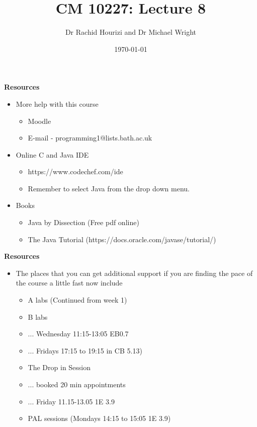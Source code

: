 \documentclass{beamer}
\begin{document}

\title{CM 10227: Lecture 8}
\author{Dr Rachid Hourizi and Dr Michael Wright}
\date{\today}
\frame{\titlepage}

\begin{frame} 
\begin{center}
\textbf{Resources}
\end{center}
\begin{itemize}
\item More help with this course
\begin{itemize}
\item Moodle
\item E-mail - programming1@lists.bath.ac.uk
\end{itemize}
\item Online C and Java IDE
\begin{itemize}
\item https://www.codechef.com/ide
\item Remember to select Java from the drop down menu.
\end{itemize}
\item Books
\begin{itemize}
\item Java by Dissection (Free pdf online)
\item The Java Tutorial (https://docs.oracle.com/javase/tutorial/)
\end{itemize}
\end{itemize}
\end{frame}

\begin{frame} 
\begin{center}
\textbf{Resources}
\end{center}
\begin{itemize}
\item The places that you can get additional support if you are finding the pace of the course a little fast now include
\begin{itemize}
\item A labs (Continued from week 1)
\item B labs 
\item ... Wednesday 11:15-13:05 EB0.7
\item ... Fridays 17:15 to 19:15 in CB 5.13)
\item The Drop in Session 
\item ... booked 20 min appointments
\item ... Friday 11.15-13.05 1E 3.9
\item PAL sessions (Mondays 14:15 to 15:05 1E 3.9)
\end{itemize}
\end{itemize}
\end{frame}
\end{document}
